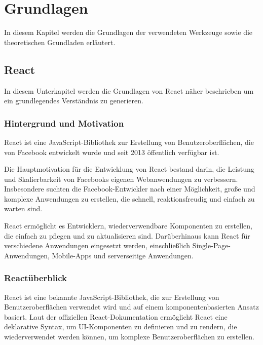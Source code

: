 



\chapter{Grundlagen}
In diesem Kapitel werden die Grundlagen der verwendeten Werkzeuge sowie die theoretischen Grundladen erläutert.
\section{React}
In diesem Unterkapitel werden die Grundlagen von React näher beschrieben um ein grundlegendes Verständnis zu generieren.

\subsection{Hintergrund und Motivation}
React ist eine JavaScript-Bibliothek zur Erstellung von Benutzeroberflächen, die von Facebook entwickelt wurde und seit 2013 öffentlich verfügbar ist.\cite{ReactGettingStarted}

Die Hauptmotivation für die Entwicklung von React bestand darin, die Leistung und Skalierbarkeit von Facebooks eigenen Webanwendungen zu verbessern. Insbesondere suchten die Facebook-Entwickler nach einer Möglichkeit, große und komplexe Anwendungen zu erstellen, die schnell, reaktionsfreudig und einfach zu warten sind.

React ermöglicht es Entwicklern, wiederverwendbare Komponenten zu erstellen, die einfach zu pflegen und zu aktualisieren sind. Darüberhinaus kann React für verschiedene Anwendungen eingesetzt werden, einschließlich Single-Page-Anwendungen, Mobile-Apps und serverseitige Anwendungen.

\subsection{Reactüberblick}

React ist eine bekannte JavaScript-Bibliothek, die zur Erstellung von Benutzeroberflächen verwendet wird und auf einem komponentenbasierten Ansatz basiert. Laut der offiziellen React-Dokumentation ermöglicht React eine deklarative Syntax, um UI-Komponenten zu definieren und zu rendern, die wiederverwendet werden können, um komplexe Benutzeroberflächen zu erstellen.\cite{ReactJS}


